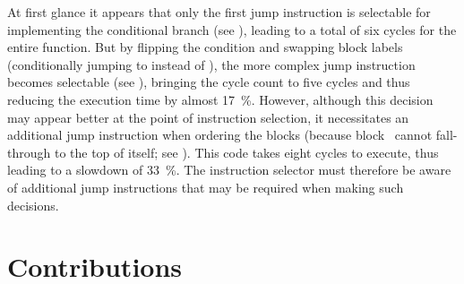 At first glance it appears that only the first jump \gls{instruction} is
selectable for implementing the conditional branch (see
), leading to a total of six cycles for
the entire \gls{function}.
%
But by flipping the condition and swapping block labels (conditionally jumping
to  instead of ), the more complex jump
\gls{instruction} becomes selectable (see
), bringing the cycle count to five
cycles and thus reducing the execution time by almost \SI{17}{\percent}.
%
However, although this decision may appear better at the point of
\gls{instruction selection}, it necessitates an additional jump
\gls{instruction} when ordering the \glspl{block} (because block~
cannot fall-through to the top of itself; see
).
%
This code takes eight cycles to execute, thus leading to a slowdown of
\SI{33}{\percent}.
%
The \gls{instruction selector} must therefore be aware of additional jump
\glspl{instruction} that may be required when making such decisions.


\section{Contributions}

